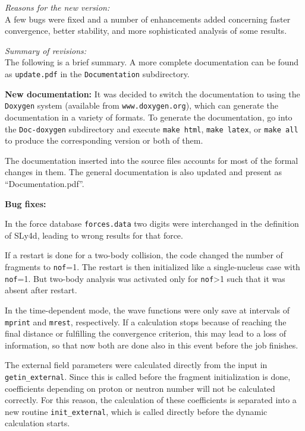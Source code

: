 \documentclass[final,1p,twocolumn]{elsarticle}
\begin{document}
\begin{small}
{\em Reasons for the new version:}\\
A few bugs were fixed and a number of enhancements added concerning
faster convergence, better stability, and more sophisticated analysis
of some results.

{\em Summary of revisions:}\\
The following is a brief summary. A more complete documentation can be
found as {\tt update.pdf} in the {\tt Documentation} subdirectory.

{\bf New documentation:} It was decided to switch the documentation to using the {\tt
    Doxygen} system (available from {\tt www.doxygen.org}), which can
  generate the documentation in a variety of formats. To generate the
  documentation, go into the {\tt Doc-doxygen} subdirectory and
  execute {\tt make html}, {\tt make latex}, or {\tt make all} to
  produce the corresponding version or both of them.

{\color{red}
  The documentation inserted into the source files accounts for most
  of the formal changes in them. The general documentation is also
  updated and present as ``Documentation.pdf''.
}

 {\bf Bug fixes:} 
\begin{enumerate}
\item In the force database {\tt forces.data} two digits were
  interchanged in the definition of SLy4d, leading to wrong results
  for that force.

\item If a restart is done for a two-body collision, the code changed
  the number of fragments to {\tt nof}=1. The restart is then
  initialized like a single-nucleus case with  {\tt nof}=1. But two-body
  analysis was activated only for {\tt nof}>1 such that it was absent
  after restart.

{\color{red}
\item In the time-dependent mode, the wave functions were only save at
  intervals of {\tt mprint} and {\tt mrest}, respectively. If a
  calculation stops because of reaching the final distance or
  fulfilling the convergence criterion, this may lead to a loss of
  information, so that now both are done also in this event before the
  job finishes.
}

\item The external field parameters were calculated directly from the
  input in {\tt getin\_external}. Since this is called before the
  fragment initialization is done, coefficients depending on proton or
  neutron number will not be calculated correctly. For this reason,
  the calculation of these coefficients is separated into a new
  routine {\tt init\_external}, which is called directly before the
  dynamic calculation starts.
\end{enumerate}


\end{small}
\end{document}
